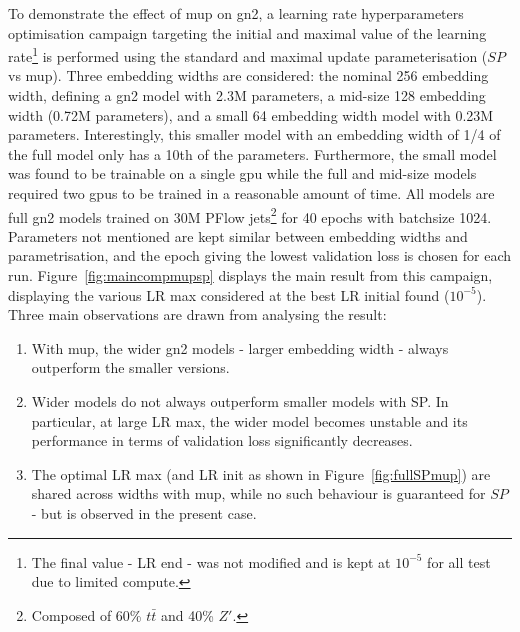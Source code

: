 To demonstrate the effect of \gls{mup} on \gls{gn2}, a learning rate hyperparameters optimisation campaign targeting the initial and maximal value of the learning rate\footnote{The final value - LR end - was not modified and is kept at $10^{-5}$ for all test due to limited compute.} is performed using the standard and maximal update parameterisation ($SP$ vs \gls{mup}). Three embedding widths are considered: the nominal 256 embedding width, defining a \gls{gn2} model with 2.3M parameters, a mid-size 128 embedding width (0.72M parameters), and a small 64 embedding width model with 0.23M parameters. Interestingly, this smaller model with an embedding width of 1/4 of the full model only has a 10th of the parameters. Furthermore, the small model was found to be trainable on a single \gls{gpu} while the full and mid-size models required two \glspl{gpu} to be trained in a reasonable amount of time. All models are full \gls{gn2} models trained on 30M PFlow jets\footnote{Composed of 60\% $t\bar{t}$ and 40\% $Z'$.} for 40 epochs with batchsize 1024. Parameters not mentioned are kept similar between embedding widths and parametrisation, and the epoch giving the lowest validation loss is chosen for each run. Figure~\ref{fig:maincompmupsp} displays the main result from this campaign, displaying the various LR max considered at the best LR initial found ($10^{-5}$). Three main observations are drawn from analysing the result:
\begin{enumerate}
  \item With \gls{mup}, the wider \gls{gn2} models - larger embedding width - always outperform the smaller versions. 
  \item Wider models do not always outperform smaller models with SP. In particular, at large LR max, the wider model becomes unstable and its performance in terms of validation loss significantly decreases.
  \item The optimal LR max (and LR init as shown in Figure~\ref{fig:fullSPmup}) are shared across widths with \gls{mup}, while no such behaviour is guaranteed for $SP$ - but is observed in the present case.
\end{enumerate}

